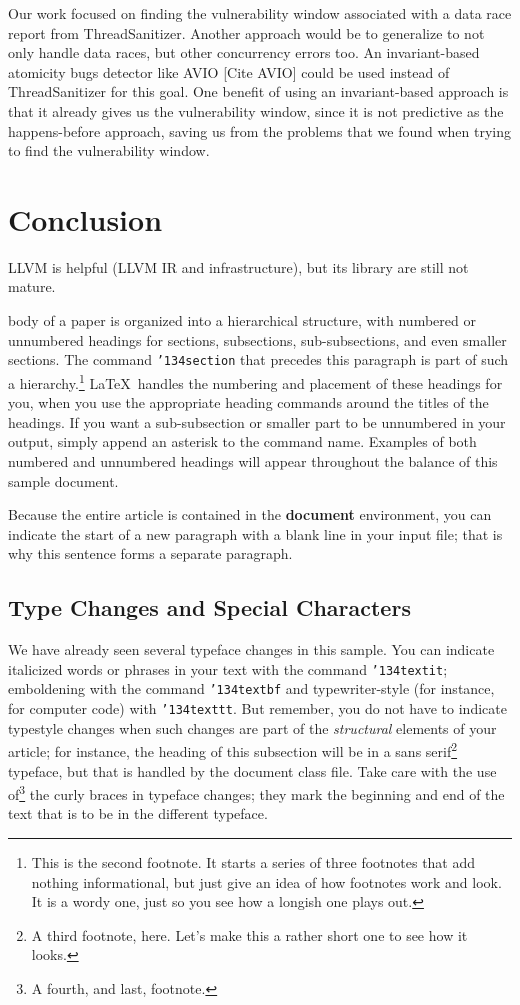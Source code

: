 \documentclass{acm_proc_article-sp}
\begin{document}
Our work focused on finding the vulnerability window associated with a data race report from ThreadSanitizer. Another approach would be to generalize to not only handle data races, but other concurrency errors too. An invariant-based atomicity bugs detector like AVIO [Cite AVIO] could be used instead of ThreadSanitizer for this goal. One benefit of using an invariant-based approach is that it already gives us the vulnerability window, since it is not predictive as the happens-before approach, saving us from the problems that we found when trying to find the vulnerability window. 

\section{Conclusion}
LLVM is helpful (LLVM IR and infrastructure), but its library are still not mature.




body of a paper is organized
into a hierarchical structure, with numbered or unnumbered
headings for sections, subsections, sub-subsections, and even
smaller sections.  The command \texttt{{\char'134}section} that
precedes this paragraph is part of such a
hierarchy.\footnote{This is the second footnote.  It
starts a series of three footnotes that add nothing
informational, but just give an idea of how footnotes work
and look. It is a wordy one, just so you see
how a longish one plays out.} \LaTeX\ handles the numbering
and placement of these headings for you, when you use
the appropriate heading commands around the titles
of the headings.  If you want a sub-subsection or
smaller part to be unnumbered in your output, simply append an
asterisk to the command name.  Examples of both
numbered and unnumbered headings will appear throughout the
balance of this sample document.

Because the entire article is contained in
the \textbf{document} environment, you can indicate the
start of a new paragraph with a blank line in your
input file; that is why this sentence forms a separate paragraph.

\subsection{Type Changes and {\subsecit Special} Characters}
We have already seen several typeface changes in this sample.  You
can indicate italicized words or phrases in your text with
the command \texttt{{\char'134}textit}; emboldening with the
command \texttt{{\char'134}textbf}
and typewriter-style (for instance, for computer code) with
\texttt{{\char'134}texttt}.  But remember, you do not
have to indicate typestyle changes when such changes are
part of the \textit{structural} elements of your
article; for instance, the heading of this subsection will
be in a sans serif\footnote{A third footnote, here.
Let's make this a rather short one to
see how it looks.} typeface, but that is handled by the
document class file. Take care with the use
of\footnote{A fourth, and last, footnote.}
the curly braces in typeface changes; they mark
the beginning and end of
the text that is to be in the different typeface.
\end{document}
